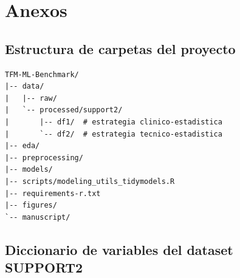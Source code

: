\section{Anexos}\label{sec:anexos}

\subsection{Estructura de carpetas del proyecto}\label{sec:anexo-estructura}

\begin{lstlisting}[basicstyle=\small\ttfamily]
TFM-ML-Benchmark/
|-- data/
|   |-- raw/
|   `-- processed/support2/
|       |-- df1/  # estrategia clinico-estadistica
|       `-- df2/  # estrategia tecnico-estadistica
|-- eda/
|-- preprocessing/
|-- models/
|-- scripts/modeling_utils_tidymodels.R
|-- requirements-r.txt
|-- figures/
`-- manuscript/
\end{lstlisting}

\subsection{Diccionario de variables del dataset SUPPORT2}\label{sec:anexo-diccionario}


